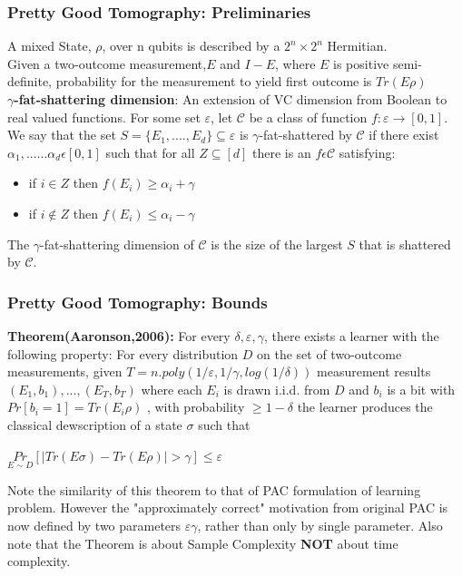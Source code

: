 \documentclass{beamer}
\begin{document}
    
    
    
    \begin{frame}
    \frametitle{Pretty Good Tomography: Preliminaries}
    A mixed State, $\rho$, over n qubits is described by a $2^{n} \times 2^{n}$ Hermitian.
    \smallskip\\ Given a two-outcome measurement,$E$ and $I-E$, where $E$ is positive semi-definite, probability for the measurement to yield first outcome is $Tr(E\rho)$
    \smallskip\\
    \textbf{$\gamma$-fat-shattering dimension}: An extension of VC dimension from Boolean to real valued functions. For some set $\varepsilon$, let $\mathcal{C}$ be a class of function $f: \varepsilon \rightarrow [0,1]$. We say that the set $S = \{E_1,....,E_d\} \subseteq \varepsilon$ is $\gamma$-fat-shattered by $\mathcal{C}$ if there exist $\alpha_1,......\alpha_d  \epsilon  [0,1]$ such that for all $Z \subseteq [d]$ there is an $f \epsilon \mathcal{C}$ satisfying:
    
    \begin{itemize}
    \item if $i \in Z$ then $f(E_i)\geq \alpha_i + \gamma$
    \item if $i \not\in Z$ then $f(E_i)\leq \alpha_i - \gamma$
    \end{itemize}
    
    The $\gamma$-fat-shattering dimension of $\mathcal{C}$ is the size of the largest $S$ that is shattered by $\mathcal{C}$. 
    \end{frame}
    
    \begin{frame}
    \frametitle{Pretty Good Tomography: Bounds}
    
    \textbf{Theorem(Aaronson,2006):} For every $\delta,\varepsilon,\gamma$, there exists a learner with the following property: For every distribution $D$ on the set of two-outcome measurements, given $T = n.poly(1/\varepsilon,1/\gamma, log(1/\delta) )$ measurement results $(E_1,b_1),...,(E_T,b_T)$ where each $E_i$ is drawn i.i.d. from $D$ and $b_i$ is a bit with $Pr[b_i = 1] = Tr(E_i\rho)$ , with probability $\geq 1 - \delta$ the learner produces the classical dewscription of a state $\sigma$ such that \begin{center}
    $\underset{ E \sim  D }{Pr} [| {Tr}(E\sigma) - {Tr}(E\rho)| > \gamma ] \leq \varepsilon   $
    
    \end{center}
    Note the similarity of this theorem to that of PAC formulation of learning problem. However the "approximately correct" motivation from original PAC is now defined by two parameters $\varepsilon \gamma$, rather than only by single parameter.
    Also note that the Theorem is about Sample Complexity \textbf{NOT} about time complexity.
    
    \end{frame}
    
\end{document}
